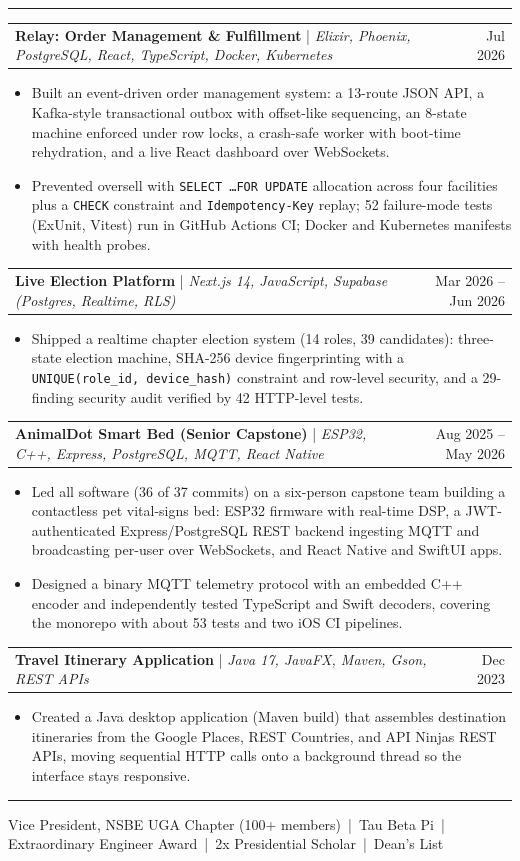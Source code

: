 \documentclass[letterpaper,10pt]{article}
\makeatletter
\newcommand{\sectiontitle}[1]{\vspace{4pt}{\textbf{\large #1}}\par\vspace{-6pt}\rule{\textwidth}{0.4pt}\par\vspace{1pt}}
\newcommand{\projectheading}[3]{\begin{tabularx}{\textwidth}{@{}X r@{}}\textbf{#1} \;|\; \textit{#2} & #3 \\ \end{tabularx}\par\vspace{1pt}}
\makeatother
\begin{document}
\sectiontitle{PROJECTS}
\projectheading{Relay: Order Management \& Fulfillment}{Elixir, Phoenix, PostgreSQL, React, TypeScript, Docker, Kubernetes}{Jul 2026}
\begin{itemize}
\item Built an event-driven order management system: a 13-route JSON API, a Kafka-style transactional outbox with offset-like sequencing, an 8-state machine enforced under row locks, a crash-safe worker with boot-time rehydration, and a live React dashboard over WebSockets.
\item Prevented oversell with \texttt{SELECT \ldots FOR UPDATE} allocation across four facilities plus a \texttt{CHECK} constraint and \texttt{Idempotency-Key} replay; 52 failure-mode tests (ExUnit, Vitest) run in GitHub Actions CI; Docker and Kubernetes manifests with health probes.
\end{itemize}
\projectheading{Live Election Platform}{Next.js 14, JavaScript, Supabase (Postgres, Realtime, RLS)}{Mar 2026 -- Jun 2026}
\begin{itemize}
\item Shipped a realtime chapter election system (14 roles, 39 candidates): three-state election machine, SHA-256 device fingerprinting with a \texttt{UNIQUE(role\_id, device\_hash)} constraint and row-level security, and a 29-finding security audit verified by 42 HTTP-level tests.
\end{itemize}
\projectheading{AnimalDot Smart Bed (Senior Capstone)}{ESP32, C++, Express, PostgreSQL, MQTT, React Native}{Aug 2025 -- May 2026}
\begin{itemize}
\item Led all software (36 of 37 commits) on a six-person capstone team building a contactless pet vital-signs bed: ESP32 firmware with real-time DSP, a JWT-authenticated Express/PostgreSQL REST backend ingesting MQTT and broadcasting per-user over WebSockets, and React Native and SwiftUI apps.
\item Designed a binary MQTT telemetry protocol with an embedded C++ encoder and independently tested TypeScript and Swift decoders, covering the monorepo with about 53 tests and two iOS CI pipelines.
\end{itemize}
\projectheading{Travel Itinerary Application}{Java 17, JavaFX, Maven, Gson, REST APIs}{Dec 2023}
\begin{itemize}
\item Created a Java desktop application (Maven build) that assembles destination itineraries from the Google Places, REST Countries, and API Ninjas REST APIs, moving sequential HTTP calls onto a background thread so the interface stays responsive.
\end{itemize}

\sectiontitle{LEADERSHIP \& HONORS}
{\small Vice President, NSBE UGA Chapter (100+ members) \,|\, Tau Beta Pi \,|\, Extraordinary Engineer Award \,|\, 2x Presidential Scholar \,|\, Dean's List}
\end{document}
